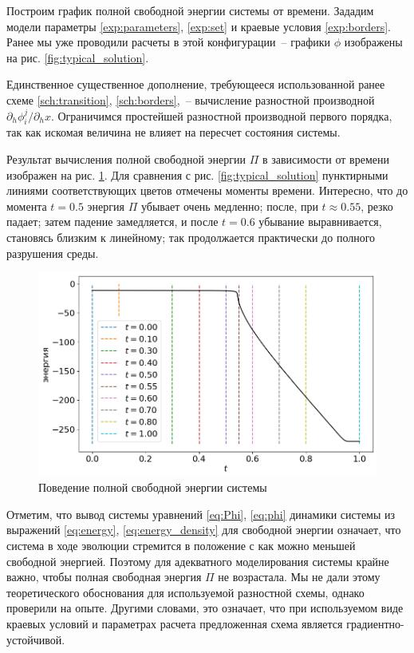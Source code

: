 Построим график полной свободной энергии системы от времени. Зададим модели параметры \eqref{exp:parameters}, \eqref{exp:set} и краевые условия \eqref{exp:borders}. Ранее мы уже проводили расчеты в этой конфигурации~-- графики $\phi$ изображены на рис. \ref{fig:typical_solution}.

Единственное существенное дополнение, требующееся использованной ранее схеме \eqref{sch:transition}, \eqref{sch:borders},~-- вычисление разностной производной $\partial_h \phi_i^j / \partial_h x$. Ограничимся простейшей разностной производной первого порядка, так как искомая величина не влияет на пересчет состояния системы.

Результат вычисления полной свободной энергии $\Pi$ в зависимости от времени изображен на рис. \ref{fig:energy}. Для сравнения с рис. \ref{fig:typical_solution} пунктирными линиями соответствующих цветов отмечены моменты времени. Интересно, что до момента $t = 0.5$ энергия $\Pi$ убывает очень медленно; после, при $t \approx 0.55$, резко падает; затем падение замедляется, и после $t = 0.6$ убывание выравнивается, становясь близким к линейному; так продолжается практически до полного разрушения среды.

\begin{figure}
	\centering
	\includegraphics[width=\textwidth]{figures/energy_total.png}
	\vspace{-0.6cm}
	\caption{Поведение полной свободной энергии системы}
	\label{fig:energy}
\end{figure}

Отметим, что вывод системы уравнений \eqref{eq:Phi}, \eqref{eq:phi} динамики системы из выражений \eqref{eq:energy}, \eqref{eq:energy_density} для свободной энергии означает, что система в ходе эволюции стремится в положение с как можно меньшей свободной энергией. Поэтому для адекватного моделирования системы крайне важно, чтобы полная свободная энергия $\Pi$ не возрастала. Мы не дали этому теоретического обоснования для используемой разностной схемы, однако проверили на опыте. Другими словами, это означает, что при используемом виде краевых условий и параметрах расчета предложенная схема является градиентно-устойчивой.